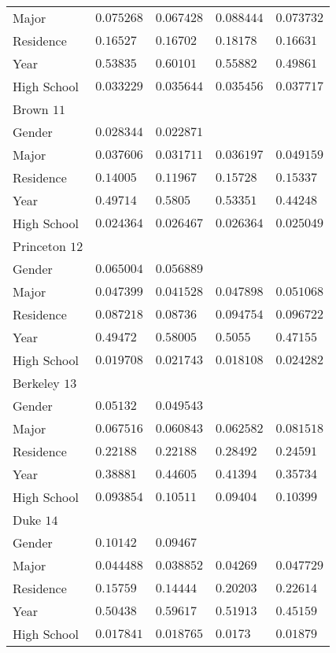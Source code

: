 \begin{center}
\begin{longtable}{|l|l|l|l|l|}
Major & $0.075268$ & $0.067428$ & $0.088444$ & $0.073732$ \\
Residence & $0.16527$ & $0.16702$ & $0.18178$ & $0.16631$ \\
Year & $0.53835$ & $0.60101$ & $0.55882$ & $0.49861$ \\
High School & $0.033229$ & $0.035644$ & $0.035456$ & $0.037717$ \\ \hline \hline
Brown $11$ & & &   \\ \hline
Gender & $0.028344$ & $0.022871$ & & \\
Major & $0.037606$ & $0.031711$ & $0.036197$ & $0.049159$ \\
Residence & $0.14005$ & $0.11967$ & $0.15728$ & $0.15337$ \\
Year & $0.49714$ & $0.5805$ & $0.53351$ & $0.44248$ \\
High School & $0.024364$ & $0.026467$ & $0.026364$ & $0.025049$ \\ \hline \hline
Princeton $12$ & & &   \\ \hline
Gender & $0.065004$ & $0.056889$ & & \\
Major & $0.047399$ & $0.041528$ & $0.047898$ & $0.051068$ \\
Residence & $0.087218$ & $0.08736$ & $0.094754$ & $0.096722$ \\
Year & $0.49472$ & $0.58005$ & $0.5055$ & $0.47155$ \\
High School & $0.019708$ & $0.021743$ & $0.018108$ & $0.024282$ \\ \hline \hline
Berkeley $13$ & & &   \\ \hline
Gender & $0.05132$ & $0.049543$ & & \\
Major & $0.067516$ & $0.060843$ & $0.062582$ & $0.081518$ \\
Residence & $0.22188$ & $0.22188$ & $0.28492$ & $0.24591$ \\
Year & $0.38881$ & $0.44605$ & $0.41394$ & $0.35734$ \\
High School & $0.093854$ & $0.10511$ & $0.09404$ & $0.10399$ \\ \hline \hline
Duke $14$ & & &   \\ \hline
Gender & $0.10142$ & $0.09467$ & & \\
Major & $0.044488$ & $0.038852$ & $0.04269$ & $0.047729$ \\
Residence & $0.15759$ & $0.14444$ & $0.20203$ & $0.22614$ \\
Year & $0.50438$ & $0.59617$ & $0.51913$ & $0.45159$ \\
High School & $0.017841$ & $0.018765$ & $0.0173$ & $0.01879$ \\ \hline \hline

\end{longtable}
\end{center}
